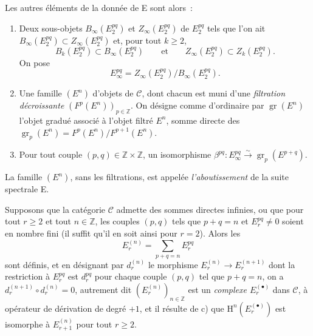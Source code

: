 \begin{env}[11.1.1]
Les autres éléments de la donnée de E sont alors~:
\begin{enumerate}
  \item[(d)] Deux sous-objets $B_\infty(E_2^{pq})$ et
    $Z_\infty(E_2^{pq})$ de $E_2^{pq}$ tels que l'on ait
    $B_\infty(E_2^{pq})\subset Z_\infty(E_2^{pq})$ et, pour tout $k\geq2$,
    \[
      B_k(E_2^{pq})\subset B_\infty(E_2^{pq})
      \qquad\text{et}\qquad
      Z_\infty(E_2^{pq})\subset Z_k(E_2^{pq}).
    \]
    On pose
    \[
    \label{0.11.1.1.3-fr}
      E_\infty^{pq}=Z_\infty(E_2^{pq})/B_\infty(E_2^{pq}).
      \tag{11.1.1.3}
    \]
  \item[(e)]
    Une famille $(E^n)$ d'objets de $\mathcal C$, dont chacun est muni d'une
    \emph{filtration décroissante} $(F^p(E^n))_{p\in\mathbb Z}$. On désigne
    comme d'ordinaire par $\operatorname{gr}(E^n)$ l'objet gradué associé à
    l'objet filtré $E^n$, somme directe des
    $\operatorname{gr}_p(E^n)=F^p(E^n)/F^{p+1}(E^n)$.
  \item[(f)] Pour tout couple $(p,q)\in\mathbb Z\times\mathbb Z$, un
    isomorphisme
    $\beta^{pq}:E_\infty^{pq}\xrightarrow{\sim}
    \operatorname{gr}_p(E^{p+q})$.
\end{enumerate}

La famille $(E^n)$, sans les filtrations, est appelée \emph{l'aboutissement}
de la suite spectrale E.

Supposons que la catégorie $\mathcal C$ admette des sommes directes infinies,
ou que pour tout $r\geq2$ et tout $n\in\mathbb Z$, les couples $(p,q)$ tels
que $p+q=n$ et $E_r^{pq}\ne0$ soient en nombre fini (il suffit qu'il en soit
ainsi pour $r=2$). Alors les
\[
  E_r^{(n)}=\sum_{p+q=n}E_r^{pq}
\]
sont définis, et en désignant par $d_r^{(n)}$ le morphisme
$E_r^{(n)}\to E_r^{(n+1)}$ dont la restriction à $E_r^{pq}$ est $d_r^{pq}$
pour chaque couple $(p,q)$ tel que $p+q=n$, on a
$d_r^{(n+1)}\circ d_r^{(n)}=0$, autrement dit $(E_r^{(n)})_{n\in\mathbb Z}$
est un \emph{complexe $E_r^{(\bullet)}$} dans $\mathcal C$, à opérateur de
dérivation de degré $+1$, et il résulte de c) que
$\mathrm H^n(E_r^{(\bullet)})$ est isomorphe à $E_{r+1}^{(n)}$ pour tout
$r\geq2$.
\end{env}

